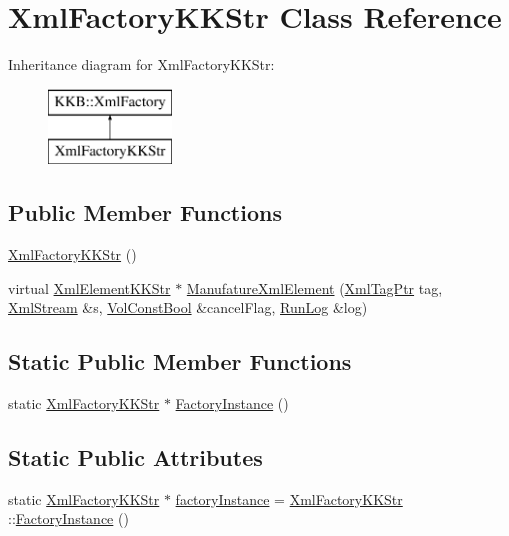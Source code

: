 \hypertarget{class_xml_factory_k_k_str}{}\section{Xml\+Factory\+K\+K\+Str Class Reference}
\label{class_xml_factory_k_k_str}
Inheritance diagram for Xml\+Factory\+K\+K\+Str\+:\begin{figure}[H]
\begin{center}
\leavevmode
\includegraphics[height=2.000000cm]{class_xml_factory_k_k_str}
\end{center}
\end{figure}
\subsection*{Public Member Functions}
\begin{DoxyCompactItemize}
\item 
\hyperlink{class_xml_factory_k_k_str_a6793d51fb39b23ae655e157b104d10dc}{Xml\+Factory\+K\+K\+Str} ()
\item 
virtual \hyperlink{class_k_k_b_1_1_xml_element_k_k_str}{Xml\+Element\+K\+K\+Str} $\ast$ \hyperlink{class_xml_factory_k_k_str_ae739dfbd9ca089f793ee515b94de96d2}{Manufature\+Xml\+Element} (\hyperlink{namespace_k_k_b_a9253a3ea8a5da18ca82be4ca2b390ef0}{Xml\+Tag\+Ptr} tag, \hyperlink{class_k_k_b_1_1_xml_stream}{Xml\+Stream} \&s, \hyperlink{namespace_k_k_b_a7d390f568e2831fb76b86b56c87bf92f}{Vol\+Const\+Bool} \&cancel\+Flag, \hyperlink{class_k_k_b_1_1_run_log}{Run\+Log} \&log)
\end{DoxyCompactItemize}
\subsection*{Static Public Member Functions}
\begin{DoxyCompactItemize}
\item 
static \hyperlink{class_xml_factory_k_k_str}{Xml\+Factory\+K\+K\+Str} $\ast$ \hyperlink{class_xml_factory_k_k_str_a711ca23fbd8bb78b2a4c98530bebb0d2}{Factory\+Instance} ()
\end{DoxyCompactItemize}
\subsection*{Static Public Attributes}
\begin{DoxyCompactItemize}
\item 
static \hyperlink{class_xml_factory_k_k_str}{Xml\+Factory\+K\+K\+Str} $\ast$ \hyperlink{class_xml_factory_k_k_str_a4a983f3ecae18bcad6344156ea4f7e1c}{factory\+Instance} = \hyperlink{class_xml_factory_k_k_str}{Xml\+Factory\+K\+K\+Str} \+::\hyperlink{class_xml_factory_k_k_str_a711ca23fbd8bb78b2a4c98530bebb0d2}{Factory\+Instance} ()
\end{DoxyCompactItemize}



